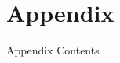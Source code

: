 \section{Appendix}

\begin{frame}[label=appendix-contents]{Appendix Contents}
  \SlideBody{%
    \vspace{0.30cm}
    \par
  }
\end{frame}

\AtBeginSection[]{}

